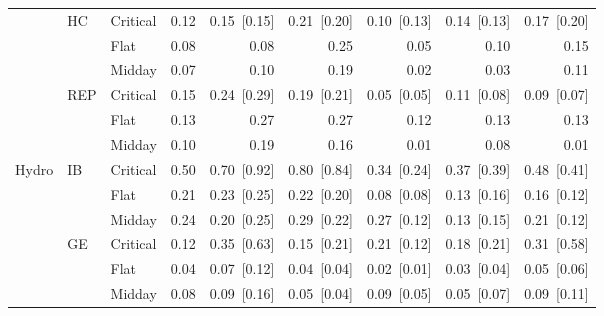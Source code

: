 \begin{tabular}{l l l r r r r r r }
 & HC & Critical & 0.12 & 0.15~{\color{seasoncol}\scriptsize[0.15]} & 0.21~{\color{seasoncol}\scriptsize[0.20]} & 0.10~{\color{seasoncol}\scriptsize[0.13]} & 0.14~{\color{seasoncol}\scriptsize[0.13]} & 0.17~{\color{seasoncol}\scriptsize[0.20]} \\
 &  & Flat & 0.08 & 0.08 & 0.25 & 0.05 & 0.10 & 0.15 \\
 &  & Midday & 0.07 & 0.10 & 0.19 & 0.02 & 0.03 & 0.11 \\
 & REP & Critical & 0.15 & 0.24~{\color{seasoncol}\scriptsize[0.29]} & 0.19~{\color{seasoncol}\scriptsize[0.21]} & 0.05~{\color{seasoncol}\scriptsize[0.05]} & 0.11~{\color{seasoncol}\scriptsize[0.08]} & 0.09~{\color{seasoncol}\scriptsize[0.07]} \\
 &  & Flat & 0.13 & 0.27 & 0.27 & 0.12 & 0.13 & 0.13 \\
 &  & Midday & 0.10 & 0.19 & 0.16 & 0.01 & 0.08 & 0.01 \\
\addlinespace
Hydro & IB & Critical & 0.50 & 0.70~{\color{seasoncol}\scriptsize[0.92]} & 0.80~{\color{seasoncol}\scriptsize[0.84]} & 0.34~{\color{seasoncol}\scriptsize[0.24]} & 0.37~{\color{seasoncol}\scriptsize[0.39]} & 0.48~{\color{seasoncol}\scriptsize[0.41]} \\
 &  & Flat & 0.21 & 0.23~{\color{seasoncol}\scriptsize[0.25]} & 0.22~{\color{seasoncol}\scriptsize[0.20]} & 0.08~{\color{seasoncol}\scriptsize[0.08]} & 0.13~{\color{seasoncol}\scriptsize[0.16]} & 0.16~{\color{seasoncol}\scriptsize[0.12]} \\
 &  & Midday & 0.24 & 0.20~{\color{seasoncol}\scriptsize[0.25]} & 0.29~{\color{seasoncol}\scriptsize[0.22]} & 0.27~{\color{seasoncol}\scriptsize[0.12]} & 0.13~{\color{seasoncol}\scriptsize[0.15]} & 0.21~{\color{seasoncol}\scriptsize[0.12]} \\
 & GE & Critical & 0.12 & 0.35~{\color{seasoncol}\scriptsize[0.63]} & 0.15~{\color{seasoncol}\scriptsize[0.21]} & 0.21~{\color{seasoncol}\scriptsize[0.12]} & 0.18~{\color{seasoncol}\scriptsize[0.21]} & 0.31~{\color{seasoncol}\scriptsize[0.58]} \\
 &  & Flat & 0.04 & 0.07~{\color{seasoncol}\scriptsize[0.12]} & 0.04~{\color{seasoncol}\scriptsize[0.04]} & 0.02~{\color{seasoncol}\scriptsize[0.01]} & 0.03~{\color{seasoncol}\scriptsize[0.04]} & 0.05~{\color{seasoncol}\scriptsize[0.06]} \\
 &  & Midday & 0.08 & 0.09~{\color{seasoncol}\scriptsize[0.16]} & 0.05~{\color{seasoncol}\scriptsize[0.04]} & 0.09~{\color{seasoncol}\scriptsize[0.05]} & 0.05~{\color{seasoncol}\scriptsize[0.07]} & 0.09~{\color{seasoncol}\scriptsize[0.11]} \\

\end{tabular}
